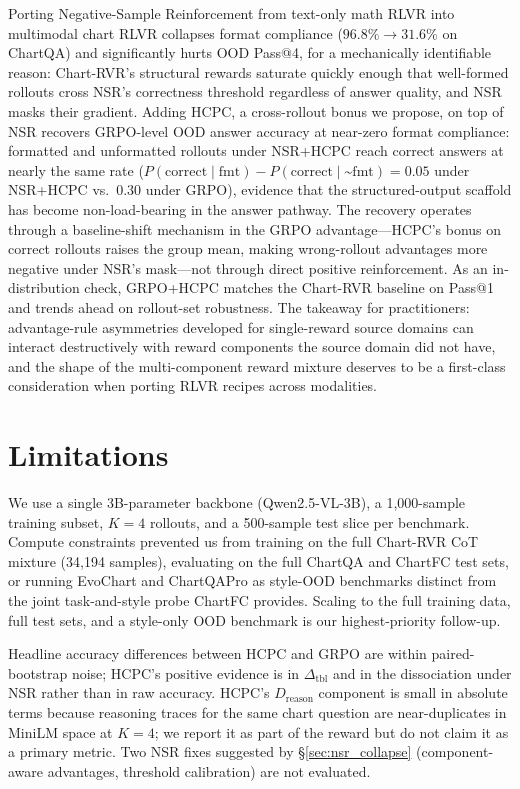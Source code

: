 \documentclass[11pt]{article}
\begin{document}
Porting Negative-Sample Reinforcement from text-only math RLVR into
multimodal chart RLVR collapses format compliance ($96.8\%\!\to\!31.6\%$
on ChartQA) and significantly hurts OOD Pass@4, for a mechanically
identifiable reason: Chart-RVR's structural rewards saturate quickly
enough that well-formed rollouts cross NSR's correctness threshold
regardless of answer quality, and NSR masks their gradient. Adding
HCPC, a cross-rollout bonus we propose, on top of NSR recovers
GRPO-level OOD answer accuracy at near-zero format compliance:
formatted and unformatted rollouts under NSR+HCPC reach correct
answers at nearly the same rate
($P(\text{correct}\mid\text{fmt}){-}P(\text{correct}\mid\text{\textasciitilde fmt}){=}0.05$
under NSR+HCPC vs.\ $0.30$ under GRPO), evidence that the
structured-output scaffold has become non-load-bearing in the
answer pathway. The recovery operates through a baseline-shift
mechanism in the GRPO advantage---HCPC's bonus on correct rollouts
raises the group mean, making wrong-rollout advantages more negative
under NSR's mask---not through direct positive reinforcement. As an
in-distribution check, GRPO+HCPC matches the Chart-RVR baseline on
Pass@1 and trends ahead on rollout-set robustness. The takeaway for
practitioners: advantage-rule asymmetries developed for single-reward
source domains can interact destructively with reward components the
source domain did not have, and the shape of the multi-component
reward mixture deserves to be a first-class consideration when
porting RLVR recipes across modalities.

\section*{Limitations}

We use a single 3B-parameter backbone (Qwen2.5-VL-3B), a 1{,}000-sample
training subset, $K{=}4$ rollouts, and a 500-sample test slice per
benchmark. Compute constraints prevented us from training on the full
Chart-RVR CoT mixture (34{,}194 samples), evaluating on the full
ChartQA and ChartFC test sets, or running EvoChart \citep{evochart}
and ChartQAPro \citep{chartqapro} as style-OOD benchmarks distinct
from the joint task-and-style probe ChartFC provides. Scaling to the
full training data, full test sets, and a style-only OOD benchmark is
our highest-priority follow-up.

Headline accuracy differences between HCPC and GRPO are within
paired-bootstrap noise; HCPC's positive evidence is in
$\Delta_{\text{tbl}}$ and in the dissociation under NSR rather than
in raw accuracy. HCPC's $D_{\text{reason}}$ component is small in
absolute terms because reasoning traces for the same chart question
are near-duplicates in MiniLM space at $K{=}4$; we report it as part
of the reward but do not claim it as a primary metric. Two NSR fixes
suggested by \S\ref{sec:nsr_collapse} (component-aware advantages,
threshold calibration) are not evaluated.
\end{document}
